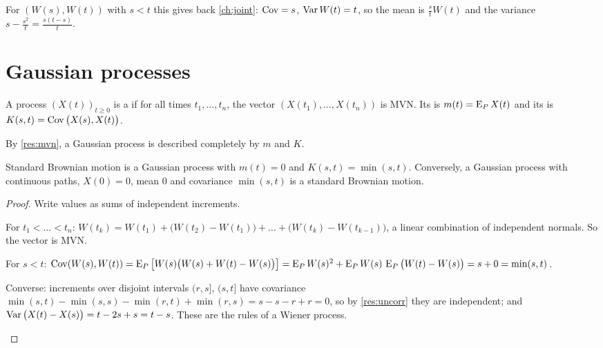 For $(W(s),W(t))$ with $s<t$ this gives back \cref{ch:joint}: $\operatorname{Cov}=s$, $\operatorname{Var} W(t)=t$, so the mean is $\frac stW(t)$ and the variance $s-\frac{s^2}{t}=\frac{s(t-s)}{t}$.

\section{Gaussian processes}

\begin{definition}
A process $(X(t))_{t\ge0}$ is a  if for all times $t_1,\dots,t_n$, the vector $(X(t_1),\dots,X(t_n))$ is MVN. Its  is $m(t)=\operatorname{E}_PX(t)$ and its  is $K(s,t)=\operatorname{Cov}\big(X(s),X(t)\big)$.
\end{definition}

By \cref{res:mvn}, a Gaussian process is described completely by $m$ and $K$.

\begin{theorem}
\label{thm:bm-gauss}
Standard Brownian motion is a Gaussian process with $m(t)=0$ and $K(s,t)=\min(s,t)$. Conversely, a Gaussian process with continuous paths, $X(0)=0$, mean $0$ and covariance $\min(s,t)$ is a standard Brownian motion.
\end{theorem}
\begin{proof}
Write values as sums of independent increments.
\begin{steps}
  \item For $t_1<\dots<t_n$: $W(t_k)=W(t_1)+\big(W(t_2)-W(t_1)\big)+\dots+\big(W(t_k)-W(t_{k-1})\big)$, a linear combination of independent normals. So the vector is MVN.
  \item For $s<t$: $\operatorname{Cov}(W(s),W(t))=\operatorname{E}_P\big[W(s)\big(W(s)+W(t)-W(s)\big)\big]=\operatorname{E}_PW(s)^2+\operatorname{E}_PW(s)\,\operatorname{E}_P\big(W(t)-W(s)\big)=s+0=\min(s,t)$.
  \item Converse: increments over disjoint intervals $(r,s]$, $(s,t]$ have covariance $\min(s,t)-\min(s,s)-\min(r,t)+\min(r,s)=s-s-r+r=0$, so by \cref{res:uncorr} they are independent; and $\operatorname{Var}\big(X(t)-X(s)\big)=t-2s+s=t-s$. These are the rules of a Wiener process. \qedhere
\end{steps}
\end{proof}

\begin{pic}
\end{pic}

